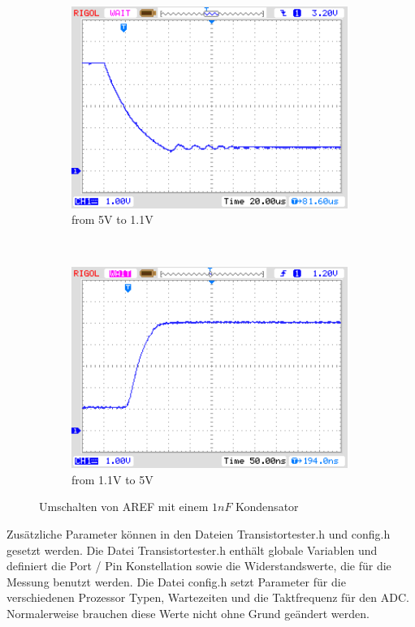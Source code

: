 \begin{figure}[H]
  \begin{subfigure}[b]{9cm}
    \centering
    \includegraphics[width=9cm]{../PNG/AREF2_1V.png}
    \caption{from 5V to 1.1V }
    \label{pic:aref1}
  \end{subfigure}
  ~
  \begin{subfigure}[b]{9cm}
    \centering
    \includegraphics[width=9cm]{../PNG/AREF2VCC.png}
    \caption{from 1.1V to 5V}
    \label{pic:aref5}
  \end{subfigure}
  \caption{Umschalten von AREF mit einem \(1nF\) Kondensator}
\end{figure}


Zus\"atzliche Parameter k\"onnen in den Dateien Transistortester.h und config.h gesetzt werden.
Die Datei Transistortester.h enth\"alt globale Variablen und definiert die Port / Pin Konstellation
sowie die Widerstandswerte, die f\"ur die Messung benutzt werden.
Die Datei config.h setzt Parameter f\"ur die verschiedenen Prozessor Typen, Wartezeiten und die
Taktfrequenz f\"ur den ADC. Normalerweise brauchen diese Werte nicht ohne Grund ge\"andert werden.
